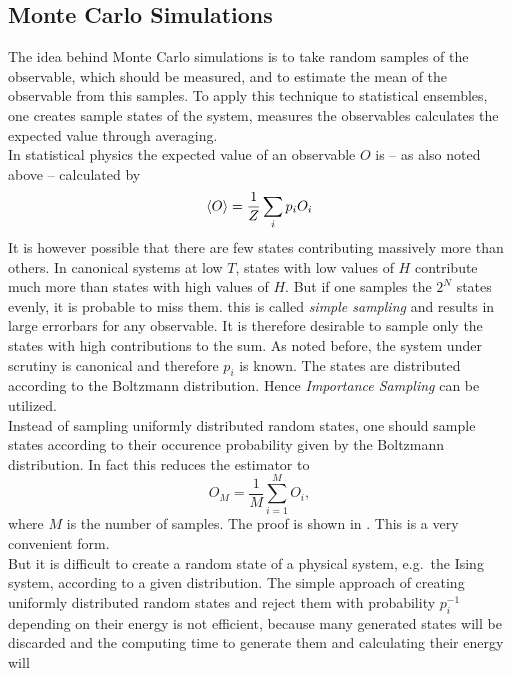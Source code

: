 \subsection{Monte Carlo Simulations}
\label{ssec:montecarlo}
    The idea behind Monte Carlo simulations is to take random samples of
    the observable, which should be measured, and to estimate the mean of
    the observable from this samples. To apply this technique to statistical
    ensembles, one creates sample states of the system, measures the
    observables calculates the expected value through averaging.\\
    In statistical physics the expected value of an observable \(O\)
    is -- as also noted above -- calculated by
    \begin{equation}
        \left< O \right> = \frac{1}{Z} \sum_i p_i O_i
    \end{equation}
    It is however possible that there are few states contributing
    massively more than others. In canonical systems at low \(T\),
    states with low values of \(H\) contribute much more than states with
    high values of \(H\).
    But if one samples the \(2^N\) states evenly, it is probable to miss
    them. this is called \emph{simple sampling} and results in large
    errorbars for any observable.
    It is therefore desirable to sample only the states with high
    contributions to the sum.
    As noted before, the system under scrutiny is canonical and therefore
    \(p_i\) is known. The states are distributed according to the Boltzmann
    distribution. Hence \emph{Importance Sampling} can be utilized.\\
    Instead of sampling uniformly distributed random states, one should sample
    states according to their occurence probability given by the Boltzmann
    distribution. In fact this reduces the estimator to
    \begin{equation}
        O_M = \frac{1}{M} \sum_{i=1}^M O_i,
    \end{equation}
    where \(M\) is the number of samples. The proof is shown in \cite{NewmanBarkema1999}.
    This is a very convenient form.\\
    But it is difficult to create a random state of a physical system,
    e.g.\ the Ising system, according to a given distribution. The simple
    approach of creating uniformly distributed random states and reject
    them with probability \(p_i^{-1}\) depending on their energy is not
    efficient, because many generated states will be discarded and the
    computing time to generate them and calculating their energy will
